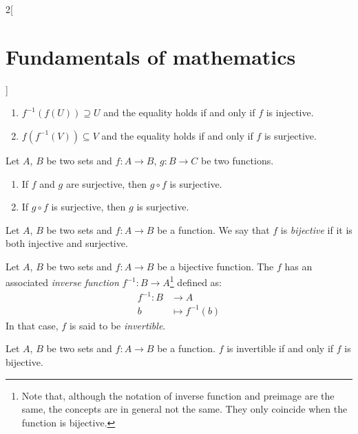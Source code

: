\documentclass[../../../main.tex]{subfiles}
\begin{document}
\begin{multicols}{2}[\section{Fundamentals of mathematics}]
\begin{prop}
\begin{enumerate}
      \item $f^{-1}(f(U))\supseteq U$ and the equality holds if and only if $f$ is injective.
      \item $f(f^{-1}(V))\subseteq V$ and the equality holds if and only if $f$ is surjective.
    \end{enumerate}
  \end{prop}
  \begin{prop}
    Let $A$, $B$ be two sets and $f:A\rightarrow B$, $g:B\rightarrow C$ be two functions.
    \begin{enumerate}
      \item If $f$ and $g$ are surjective, then $g\circ f$ is surjective.
      \item If $g\circ f$ is surjective, then $g$ is surjective.
    \end{enumerate}
  \end{prop}
  \begin{definition}
    Let $A$, $B$ be two sets and $f:A\rightarrow B$ be a function. We say that $f$ is \emph{bijective} if it is both injective and surjective.
  \end{definition}
  \begin{prop}
    Let $A$, $B$ be two sets and $f:A\rightarrow B$ be a bijective function. The $f$ has an associated \emph{inverse function} $f^{-1}:B\rightarrow A$\footnote{Note that, although the notation of inverse function and preimage are the same, the concepts are in general not the same. They only coincide when the function is bijective.} defined as:
    \begin{align*}
      f^{-1}:B & \longrightarrow A     \\
      b        & \longmapsto f^{-1}(b)
    \end{align*}
    In that case, $f$ is said to be \emph{invertible}.
  \end{prop}
  \begin{theorem}
    Let $A$, $B$ be two sets and $f:A\rightarrow B$ be a function. $f$ is invertible if and only if $f$ is bijective.
  \end{theorem}

\end{multicols}
\end{document}
